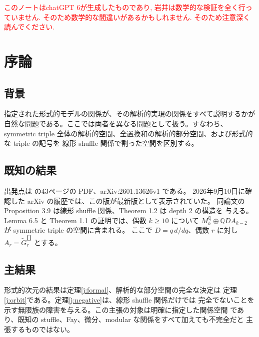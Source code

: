 \documentclass[12pt]{amsart}
\theoremstyle{definition}
\theoremstyle{remark}
\numberwithin{equation}{section}
\newcommand{\Q}{\mathbb{Q}}
\newcommand{\xr}[1]{\textcolor{red}{#1}}
\newcommand{\sh}{\mathbin{\amalg}}
\numberwithin{equation}{section}
\begin{document}
\xr{このノートはchatGPT 6が生成したものであり, 岩井は数学的な検証を全く行っていません. そのため数学的な間違いがあるかもしれません. そのため注意深く読んでください.}

\section{序論}
\subsection{背景}
指定された形式的モデルの関係が、その解析的実現の関係をすべて説明するかが
自然な問題である。ここでは両者を異なる問題として扱う。すなわち、symmetric triple
全体の解析的空間、全置換和の解析的部分空間、および形式的な triple の記号を
線形 shuffle 関係で割った空間を区別する。

\subsection{既知の結果}
出発点は \cite{j-hst} の43ページの PDF、arXiv:2601.13626v1 である。
2026年9月10日に確認した arXiv の履歴では、この版が最新版として表示されていた。
同論文の Proposition 3.9 は線形 shuffle 関係、Theorem 1.2 は depth 2 の構造を
与える。Lemma 6.5 と Theorem 1.1 の証明では、偶数 $k\ge10$ について
$M_k^{\Q}\oplus\Q D A_{k-2}$ が symmetric triple の空間に含まれる。
ここで $D=q\,d/dq$、偶数 $r$ に対し $A_r=\widetilde G_r^{\sh}$ とする。

\subsection{主結果}
形式的次元の結果は定理\ref{j:formal}、解析的な部分空間の完全な決定は
定理\ref{j:orbit}である。定理\ref{j:negative}は、線形 shuffle 関係だけでは
完全でないことを示す無限族の障害を与える。この主張の対象は明確に指定した関係空間
であり、既知の stuffle、Fay、微分、modular な関係をすべて加えても不完全だと
主張するものではない。
\end{document}

